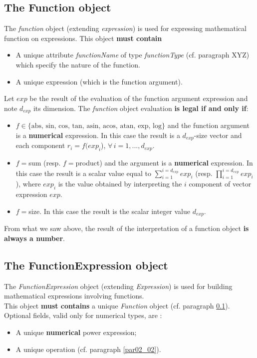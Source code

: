 \documentclass[11pt]{amsart}
\begin{document}
\subsection{The Function object}\label{par02_05}
The {\it function} object (extending {\it expression}) is used for expressing mathematical function on expressions.
This object {\bf must contain} 
\begin{itemize}
\item A unique attribute {\it functionName} of type {\it functionType} (cf. paragraph XYZ) which specify the nature of the function.
\item A unique expression (which is the function argument).\\
\end{itemize}
Let $exp$ be the result of the evaluation of the function argument expression and note $d_{exp}$ its dimension.
The {\it function} object evaluation {\bf is legal if and only if}:
\begin{itemize}
\item $f  \in \{ \mbox{abs, sin, cos, tan, asin, acos, atan, exp, log} \}$ and the function argument is a {\bf numerical} expression. In this case the  result  is a $d_{exp}$-size vector and each component  $r_i = f(exp_i$), $\forall \, i=1,...,d_{exp}$.
\item $f=$sum (resp. $f=$product) and the argument is a {\bf numerical} expression. In this case the result is a scalar value equal to $\sum_{i=1}^{i=d_{exp}} exp_i$ (resp. $\prod _{i=1}^{i=d_{exp}} exp_i$), where $exp_i$ is the value obtained 
by interpreting the $i$ component of vector expression $exp$.
\item $f=$size. In this case the result is the scalar integer value $d_{exp}$. 
\end{itemize}
From what we saw above, the result of the interpretation of a function object { \bf is always a number}.

\subsection{The FunctionExpression object} 
The {\it FunctionExpression} object (extending {\it Expression}) is used for building mathematical expressions involving functions.\\
This object {\bf must contains} a unique {\it Function} object (cf. paragraph \ref{par02_05}).\\
Optional fields, valid only for numerical types, are : 
\begin{itemize}
\item A unique {\bf numerical} power expression;
\item A unique operation (cf. paragraph \ref{par02_02}).\\
\end{itemize}
\end{document}

